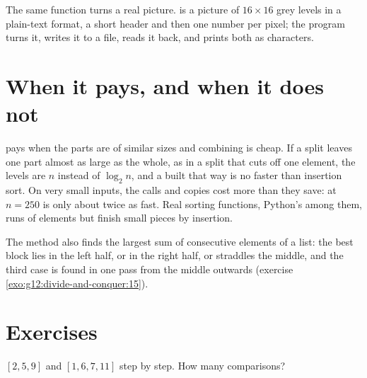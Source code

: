 The same function turns a real picture.  is a picture of $16 \times 16$ grey levels in a plain-text
format, a short header and then one number per pixel; the program turns it, writes it to a file, reads it back, and prints both as characters.

\label{lst:g12:divide-and-conquer:rotate-image}

\label{out:g12:divide-and-conquer:rotate-image}

\section{When it pays, and when it does not}\label{sec:g12:divide-and-conquer:when}

 pays when the parts are of similar sizes and combining is cheap. If a split leaves one part
almost as large as the whole, as in a split that cuts off one element, the levels are $n$ instead of $\log_2 n$, and
a  built that way is no faster than insertion sort. On very small inputs, the calls and copies cost more
than they save: at $n = 250$  is only about twice as fast. Real sorting functions, Python's 
among them,  runs of elements but finish small pieces by insertion.

\begin{remark}
The method also finds the largest sum of consecutive elements of a list: the best block lies in the left half, or in
the right half, or straddles the middle, and the third case is found in one pass from the middle outwards (exercise
\ref{exo:g12:divide-and-conquer:15}).
\end{remark}

\section{Exercises}\label{sec:g12:divide-and-conquer:exercises}

\begin{exercise}[$\star$]\label{exo:g12:divide-and-conquer:1}
 $[2, 5, 9]$ and $[1, 6, 7, 11]$ step by step. How many comparisons?
\end{exercise}

